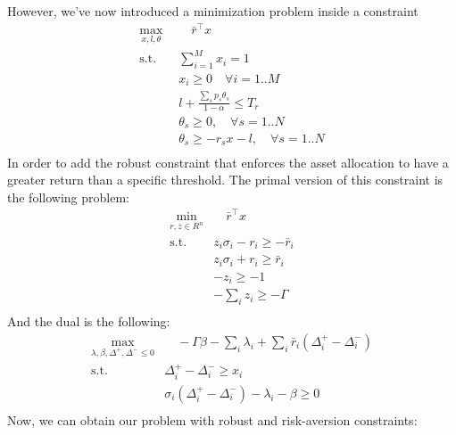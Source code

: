 \documentclass{article}
\begin{document}
However, we've now introduced a minimization problem inside a constraint 
\begin{equation}
  \begin{aligned}
  \max_{x, l, \theta} &\quad \bar{r}^\intercal x\\
  \textrm{s.t.} \quad & \sum_{i=1}^M x_i = 1\\
    & x_i \geq 0 \quad \forall i=1..M\\
    & l + \frac{\sum_s p_s \theta_s}{1-\alpha} \leq T_r\\
    & \theta_s \geq 0, \quad \forall s=1..N\\
    & \theta_s \geq -r_sx - l, \quad \forall s=1..N\\
  \end{aligned}
\end{equation}
In order to add the robust constraint that enforces the asset allocation to have a greater return than a specific threshold. The primal version of this constraint is the following problem:
\begin{equation}
  \begin{aligned}
  \min_{r, z\in R^n} &\quad \bar{r}^\intercal x\\
  \textrm{s.t.} \quad
    & z_i\sigma_i - r_i \geq -\bar{r}_i\\
    & z_i\sigma_i + r_i \geq \bar{r}_i\\
    & -z_i \geq -1\\
    & -\sum_i z_i \geq - \Gamma\\
  \end{aligned}
\end{equation}
And the dual is the following:
\begin{equation}
  \begin{aligned}
  \max_{\lambda, \beta, \Delta^+, \Delta^- \leq 0} &\quad -\Gamma \beta - \sum_i \lambda_i + \sum_i \bar{r}_i(\Delta_i^+ - \Delta_i^-) \\
  \textrm{s.t.} \quad & \Delta_i^+ - \Delta_i^- \geq x_i\\
    & \sigma_i(\Delta_i^+ - \Delta_i^-) - \lambda_i - \beta \geq 0\\
  \end{aligned}
\end{equation}
Now, we can obtain our problem with robust and risk-aversion constraints:
\end{document}
